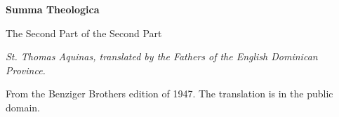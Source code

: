 \documentclass[11pt,letterpaper]{article}
\begin{document}
\color{ink}

\begin{titlepage}
\centering
\vspace*{4em}
{\LARGE\bfseries\color{heading} Summa Theologica\par}
\vspace{1.5em}
{\Large\color{subhead} The Second Part of the Second Part\par}
\vspace{2.5em}
{\itshape\color{subhead} St. Thomas Aquinas, translated by the Fathers of
the English Dominican Province.\par}
\vfill
{\small From the Benziger Brothers edition of 1947. The translation is in
the public domain.\par}
\vspace{2em}
\end{titlepage}

\tableofcontents


\end{document}
